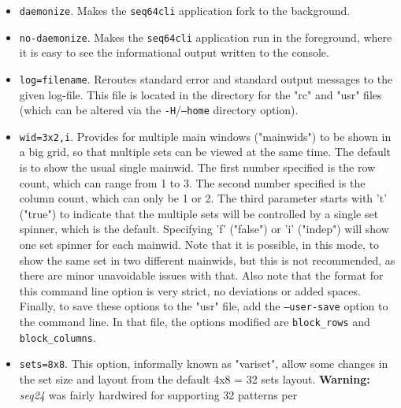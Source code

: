       \begin{itemize}
         \item \texttt{daemonize}.
            Makes the \texttt{seq64cli} application
            fork to the background.
         \item \texttt{no-daemonize}.
            Makes the \texttt{seq64cli} application
            run in the foreground, where it is easy to see the informational
            output written to the console.
         \item \texttt{log=filename}.
            Reroutes standard error and standard
            output messages to the given log-file.  This file is located in the
            directory for the "rc" and "usr" files (which can be altered via
            the \texttt{-H}/\texttt{--home} directory option).
         \item \texttt{wid=3x2,i}.
            Provides for multiple main windows ("mainwids") to be shown in a
            big grid, so that multiple sets can be viewed at the same time.
            The default is to show the usual single mainwid.
            The first number specified is the row count, which can range from 1
            to 3.  The second number specified is the column count, which can
            only be 1 or 2.  The third parameter starts with 't' ("true")
            to indicate that the multiple sets will be controlled by a single
            set spinner, which is the default.  Specifying 'f' ("false") or 'i'
            ("indep") will show one set spinner for each mainwid.  Note that it
            is possible, in this mode, to show the same set in two different
            mainwids, but this is not recommended, as there are minor
            unavoidable issues with that.  Also note that the format for this
            command line option is very strict, no deviations or added spaces.
            Finally, to save these options to the "usr" file, add the
            \texttt{--user-save} option to the command line.
            In that file, the options modified are \texttt{block\_rows} and
            \texttt{block\_columns}.
         \item \texttt{sets=8x8}.
            This option, informally known as "variset", allow some changes in
            the set size and layout from the default 4x8 = 32 sets layout.
            \textbf{Warning:}
            \textsl{seq24} was fairly hardwired for supporting 32 patterns per

\end{itemize}
